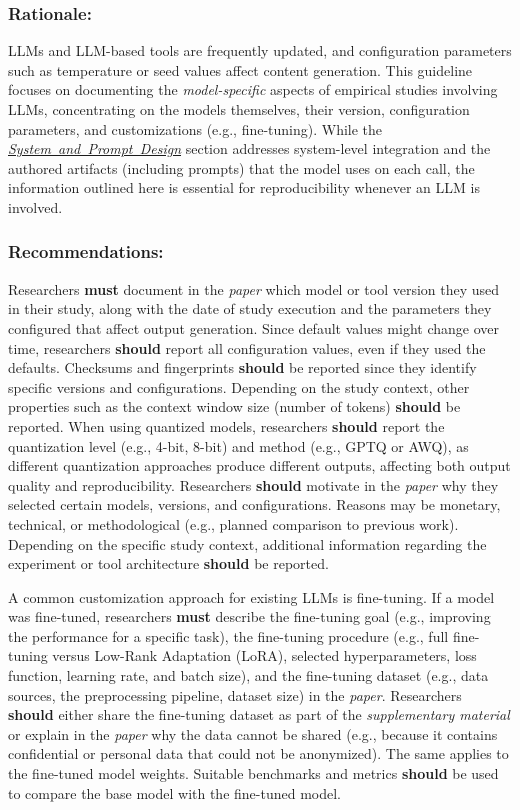 \documentclass[smallextended]{svjour3}
\newcommand{\must}{\textbf{must}\xspace}
\newcommand{\should}{\textbf{should}\xspace}
\newcommand{\paper}{\emph{paper}\xspace}
\newcommand{\supplementarymaterial}{\emph{supplementary material}\xspace}
\newcommand{\paper}{\emph{paper}\xspace}
\newcommand{\supplementarymaterial}{\emph{supplementary material}\xspace}
\newcommand{\design}{\hyperref[sec:report-system-and-prompt-design]{\mbox{\emph{System and Prompt Design}}}\xspace}
\newcommand{\design}{\href{/guidelines/design/}{\emph{System and Prompt Design}}\xspace}
\newcommand{\guidelinesubsubsection}[1]{\subsubsection{\bfseries #1:}}
\newcommand{\guidelinesubsubsection}[1]{\subsubsection{#1}}
\begin{document}
\guidelinesubsubsection{Rationale}

LLMs and LLM-based tools are frequently updated, and configuration parameters such as temperature or seed values affect content generation. 
This guideline focuses on documenting the \emph{model-specific} aspects of empirical studies involving LLMs, concentrating on the models themselves, their version, configuration parameters, and customizations (e.g., fine-tuning). While the \design section addresses system-level integration and the authored artifacts (including prompts) that the model uses on each call, the information outlined here is essential for reproducibility whenever an LLM is involved.

\guidelinesubsubsection{Recommendations}

Researchers \must document in the \paper which model or tool version they used in their study, along with the date of study execution and the parameters they configured that affect output generation.
Since default values might change over time, researchers \should report all configuration values, even if they used the defaults.
Checksums and fingerprints \should be reported since they identify specific versions and configurations.
Depending on the study context, other properties such as the context window size (number of tokens) \should be reported.
When using quantized models, researchers \should report the quantization level (e.g., 4-bit, 8-bit) and method (e.g., GPTQ or AWQ), as different quantization approaches produce different outputs, affecting both output quality and reproducibility.
Researchers \should motivate in the \paper why they selected certain models, versions, and configurations.
Reasons may be monetary, technical, or methodological (e.g., planned comparison to previous work).
Depending on the specific study context, additional information regarding the experiment or tool architecture \should be reported.

A common customization approach for existing LLMs is fine-tuning.
If a model was fine-tuned, researchers \must describe the fine-tuning goal (e.g., improving the performance for a specific task), the fine-tuning procedure (e.g., full fine-tuning versus Low-Rank Adaptation (LoRA), selected hyperparameters, loss function, learning rate, and batch size), and the fine-tuning dataset (e.g., data sources, the preprocessing pipeline, dataset size) in the \paper.
Researchers \should either share the fine-tuning dataset as part of the \supplementarymaterial or explain in the \paper why the data cannot be shared (e.g., because it contains confidential or personal data that could not be anonymized).
The same applies to the fine-tuned model weights.
Suitable benchmarks and metrics \should be used to compare the base model with the fine-tuned model.
\end{document}
